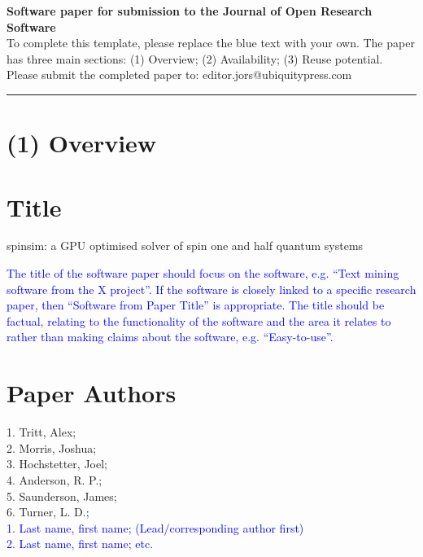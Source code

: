 \documentclass{jors}
\begin{document}
{\bf Software paper for submission to the Journal of Open Research Software} \\

To complete this template, please replace the blue text with your own. The paper has three main sections: (1) Overview; (2) Availability; (3) Reuse potential. \\

Please submit the completed paper to: editor.jors@ubiquitypress.com

\rule{\textwidth}{1pt}

\section*{(1) Overview}

\vspace{0.5cm}

\section*{Title}
spinsim: a GPU optimised solver of spin one and half quantum systems

\textcolor{blue}{The title of the software paper should focus on the software, e.g. “Text mining software from the X project”. If the software is closely linked to a specific research paper, then “Software from Paper Title” is appropriate. The title should be factual, relating to the functionality of the software and the area it relates to rather than making claims about the software, e.g. “Easy-to-use”.}

\section*{Paper Authors}
1. Tritt, Alex;\\
2. Morris, Joshua;\\
3. Hochstetter, Joel;\\
4. Anderson, R. P.;\\
5. Saunderson, James;\\
6. Turner, L. D.;\\

\textcolor{blue}{1. Last name, first name; (Lead/corresponding author first) \\
2. Last name, first name; etc.}
\end{document}
